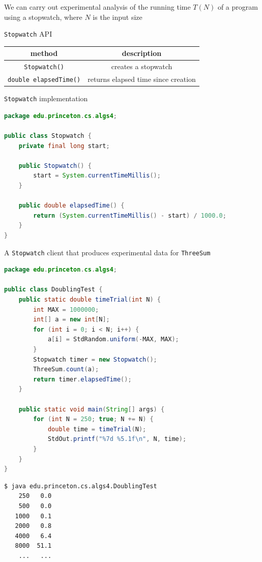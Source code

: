 \documentclass[8pt,a4paper,compress]{beamer}
\begin{document}
\begin{frame}[fragile]
\pause

We can carry out experimental analysis of the running time $T(N)$ of a program using a stopwatch, where $N$ is the input size

\pause
\bigskip

\lstinline{Stopwatch} API
\begin{center}
\begin{tabular}{cc}
method & description \\ \hline
\lstinline$Stopwatch()$ & creates a stopwatch \\
\lstinline$double elapsedTime()$ & returns elapsed time since creation
\end{tabular} 
\end{center}

\pause
\bigskip

\lstinline{Stopwatch} implementation
\begin{lstlisting}[language=Java]
package edu.princeton.cs.algs4;

public class Stopwatch {
    private final long start;
    
    public Stopwatch() { 
        start = System.currentTimeMillis(); 
    }
    
    public double elapsedTime() {
        return (System.currentTimeMillis() - start) / 1000.0;
    }
}
\end{lstlisting}
\end{frame}

\begin{frame}[fragile]
\pause

A \lstinline{Stopwatch} client that produces experimental data for \lstinline{ThreeSum}
\begin{lstlisting}[language=Java]
package edu.princeton.cs.algs4;

public class DoublingTest {
    public static double timeTrial(int N) {
        int MAX = 1000000;
        int[] a = new int[N];
        for (int i = 0; i < N; i++) {
            a[i] = StdRandom.uniform(-MAX, MAX);
        }
        Stopwatch timer = new Stopwatch();
        ThreeSum.count(a);
        return timer.elapsedTime();
    }

    public static void main(String[] args) { 
        for (int N = 250; true; N += N) {
            double time = timeTrial(N);
            StdOut.printf("%7d %5.1f\n", N, time);
        } 
    } 
} 
\end{lstlisting}

\pause

\begin{lstlisting}[language={}]
$ java edu.princeton.cs.algs4.DoublingTest
    250   0.0
    500   0.0
   1000   0.1
   2000   0.8
   4000   6.4
   8000  51.1
    ...   ...
\end{lstlisting}
\end{frame}
\end{document}
